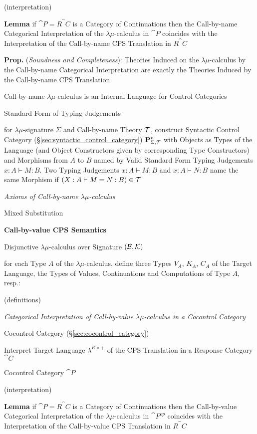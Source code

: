 (interpretation) %

\textbf{Lemma} if $\cat{P} = R^\cat{C}$ is a Category of Continuations
then the Call-by-name Categorical Interpretation of the
$\lambda\mu$-calculus in $\cat{P}$ coincides with the Interpretation
of the Call-by-name CPS Translation in $R^\cat{C}$

\textbf{Prop.} (\emph{Soundness and Completeness}): Theories Induced
on the $\lambda\mu$-calculus by the Call-by-name Categorical
Interpretation are exactly the Theories Induced by the Call-by-name
CPS Translation

Call-by-name $\lambda\mu$-calculus is an Internal Language for Control
Categories


Standard Form of Typing Judgements %

for $\lambda\mu$-signature $\Sigma$ and Call-by-name Theory
$\mathcal{T}$, construct Syntactic Control Category
(\S\ref{sec:syntactic_control_category})
$\mathbf{P}^n_{\Sigma,\mathcal{T}}$ with Objects as Types of the Language
(and Object Constructors given by corresponding Type Constructors) and
Morphisms from $A$ to $B$ named by Valid Standard Form Typing
Judgements $x:A \vdash M:B$. Two Typing Judgements $x:A \vdash M:B$
and $x:A \vdash N:B$ name the same Morphism if $(X:A \vdash M=N:B) \in
\mathcal{T}$


\emph{Axioms of Call-by-name $\lambda\mu$-calculus} %

Mixed Substitution


\textbf{Call-by-value CPS Semantics}

Disjunctive $\lambda\mu$-calculus over Signature
$(\mathcal{B},\mathcal{K})$

for each Type $A$ of the $\lambda\mu$-calculus, define three Types
$V_A$, $K_A$, $C_A$ of the Target Language, the Types of Values,
Continuations and Computations of Type $A$, resp.:

(definitions) %

\emph{Categorical Interpretation of Call-by-value $\lambda\mu$-calculus
  in a Cocontrol Category}

Cocontrol Category (\S\ref{sec:cocontrol_category})

Interpret Target Language $\lambda^{R\times+}$ of the CPS Translation
in a Response Category $\cat{C}$

Cocontrol Category $\cat{P}$

(interpretation) %

\textbf{Lemma} if $\cat{P} = R^\cat{C}$ is a Category of Continuations
then the Call-by-value Categorical Interpretation of the
$\lambda\mu$-calculus in $\cat{P}^{op}$ coincides with the
Interpretation of the Call-by-value CPS Translation in $R^\cat{C}$

